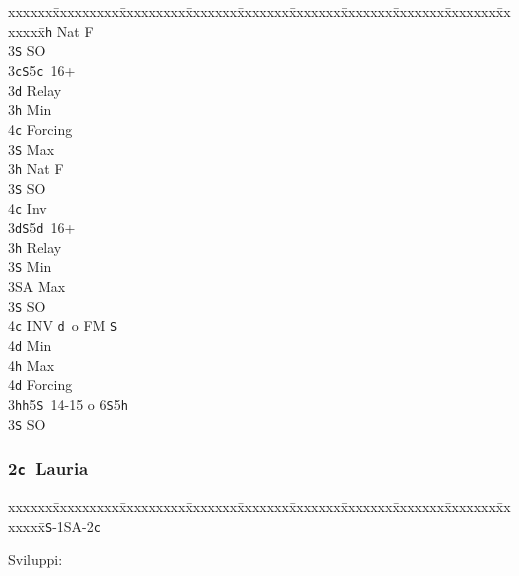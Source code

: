 \documentclass[a4paper,italian]{article}
\newcommand{\BS}{\small{\texttt{S}}}
\newcommand{\BC}{\small{\texttt{c}}}
\newcommand{\BD}{\small{\texttt{d}}}
\newcommand{\BH}{\small{\texttt{h}}}
\newcommand{\pdfc}{\texorpdfstring{\texttt{c}}{C}}
\newenvironment{bidtable}
{\begin{tabbing}

    xxxxxx\=xxxxxxxxx\=xxxxxxxxx\=xxxxxxx\=xxxxxxx\=xxxxxxx\=xxxxxxx\=xxxxxxx\=xxxxxxx\=xxxxxxx\=\kill}
{\end{tabbing} }%
\begin{document}
\begin{multicols}{2}
\begin{bidtable}
        3\BH \> Nat F\\
        3\BS \> SO\-\\
        3\BC {}\BS 5\BC\ 16+\+\\
        3\BD \> Relay\+\\
        3\BH \> Min\+\\
        4\BC \> Forcing\-\\
        3\BS \> Max\-\\
        3\BH \> Nat F\\
        3\BS \> SO\\
        4\BC \> Inv\-\\
        3\BD {}\BS 5\BD\ 16+\+\\
        3\BH \> Relay\+\\
        3\BS \> Min\\
        3\small{SA} \> Max\-\\
        3\BS \> SO\\
        4\BC \> INV \BD\ o FM \BS \+\\
        4\BD \> Min\\
        4\BH \> Max\-\\
        4\BD \> Forcing\-\\
        3\BH {}\BH 5\BS\ 14-15 o 6\BS 5\BH \+\\
        3\BS \> SO\-\-
    \end{bidtable}

    \subsubsection{2\pdfc\ Lauria}

    \begin{bidtable}
        1\BS-1\small{SA}-2\BC
    \end{bidtable}

    Sviluppi:


\end{multicols}
\end{document}
